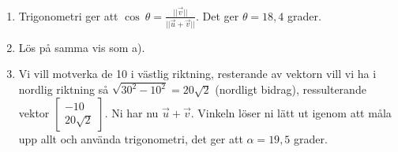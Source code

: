 \begin{enumerate}
\item Trigonometri ger att $\cos\ \theta = \frac{||\vec{v}||}{||\vec{u} + \vec{v}||} $. Det ger $\theta = 18,4$ grader. 
\item Lös på samma vis som a). 
\item Vi vill motverka de 10 i västlig riktning, resterande av vektorn vill vi ha i nordlig riktning så $\sqrt{30^{2}-10^{2}} = 20\sqrt{2}$ (nordligt bidrag), ressulterande vektor $\begin{bmatrix} -10 \\ 20\sqrt{2} \end{bmatrix}$. Ni har nu $\vec{u} + \vec{v}$. Vinkeln löser ni lätt ut igenom att måla upp allt och använda trigonometri, det ger att $\alpha = 19,5$ grader. 
\end{enumerate}